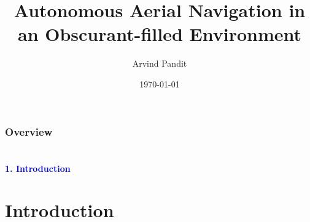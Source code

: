 \documentclass[10pt]{beamer}
\title[]{\textbf{Autonomous Aerial Navigation in an Obscurant-filled Environment}} %
\author[]{Arvind Pandit } %
\institute[] %
{
	Roll No: 211022001 \\
	Department of Electrical Engineering\\
	Indian Institute of Technology Dharwad\\ %
	
	
	\normalsize{Guide : Prof. Ameer Mulla}
	\medskip
}
\date{\today} %
\begin{document}
\begin{frame}
    \titlepage %
\end{frame}

\begin{frame}
    \frametitle{Overview} %
    \tableofcontents %
\end{frame}


%
\section*{}
\begin{frame}{}
    \huge{\centerline{\textcolor{blue}{\textbf{1. Introduction}}}}
\end{frame}


\section{Introduction}
\end{document}
